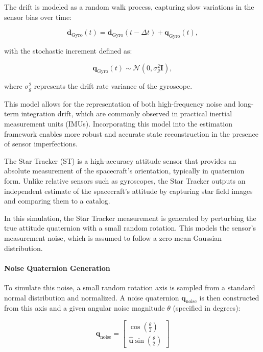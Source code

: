 The drift is modeled as a random walk process, capturing slow variations in the sensor bias over time:

\begin{equation}
    \mathbf{d}_{\text{Gyro}}(t) = \mathbf{d}_{\text{Gyro}}(t - \Delta t) + \mathbf{q}_{\text{Gyro}}(t),
\end{equation}

with the stochastic increment defined as:

\begin{equation}
    \mathbf{q}_{\text{Gyro}}(t) \sim \mathcal{N}(0, \sigma_g^2 \mathbf{I}),
\end{equation}

where $\sigma_g^2$ represents the drift rate variance of the gyroscope.

This model allows for the representation of both high-frequency noise and long-term integration drift, which are commonly observed in practical inertial measurement units (IMUs). Incorporating this model into the estimation framework enables more robust and accurate state reconstruction in the presence of sensor imperfections.






The Star Tracker (ST) is a high-accuracy attitude sensor that provides an absolute measurement of the spacecraft's orientation, typically in quaternion form. Unlike relative sensors such as gyroscopes, the Star Tracker outputs an independent estimate of the spacecraft’s attitude by capturing star field images and comparing them to a catalog.

In this simulation, the Star Tracker measurement is generated by perturbing the true attitude quaternion with a small random rotation. This models the sensor's measurement noise, which is assumed to follow a zero-mean Gaussian distribution.

\paragraph{Noise Quaternion Generation}

To simulate this noise, a small random rotation axis is sampled from a standard normal distribution and normalized. A noise quaternion $\mathbf{q}_{\text{noise}}$ is then constructed from this axis and a given angular noise magnitude $\theta$ (specified in degrees):

\begin{equation}
    \mathbf{q}_{\text{noise}} = 
    \begin{bmatrix}
        \cos\left(\frac{\theta}{2}\right) \\
        \hat{\mathbf{u}} \sin\left(\frac{\theta}{2}\right)
    \end{bmatrix}
\end{equation}


